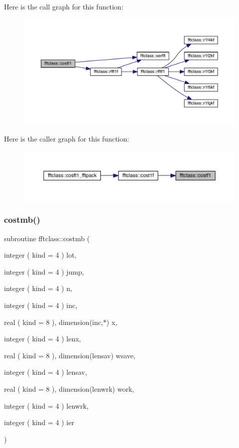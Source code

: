 Here is the call graph for this function\+:\nopagebreak
\begin{figure}[H]
\begin{center}
\leavevmode
\includegraphics[width=350pt]{namespacefftclass_af419be9c656e387f89facc1033cf4f55_cgraph}
\end{center}
\end{figure}
Here is the caller graph for this function\+:\nopagebreak
\begin{figure}[H]
\begin{center}
\leavevmode
\includegraphics[width=350pt]{namespacefftclass_af419be9c656e387f89facc1033cf4f55_icgraph}
\end{center}
\end{figure}
\mbox{\label{namespacefftclass_a1bb83e3c96bf08b2789acf52feef22b8}} 
\subsubsection{\texorpdfstring{costmb()}{costmb()}}
{\footnotesize\ttfamily subroutine fftclass\+::costmb (\begin{DoxyParamCaption}\item[{integer ( kind = 4 )}]{lot,  }\item[{integer ( kind = 4 )}]{jump,  }\item[{integer ( kind = 4 )}]{n,  }\item[{integer ( kind = 4 )}]{inc,  }\item[{real ( kind = 8 ), dimension(inc,$\ast$)}]{x,  }\item[{integer ( kind = 4 )}]{lenx,  }\item[{real ( kind = 8 ), dimension(lensav)}]{wsave,  }\item[{integer ( kind = 4 )}]{lensav,  }\item[{real ( kind = 8 ), dimension(lenwrk)}]{work,  }\item[{integer ( kind = 4 )}]{lenwrk,  }\item[{integer ( kind = 4 )}]{ier }\end{DoxyParamCaption})}

